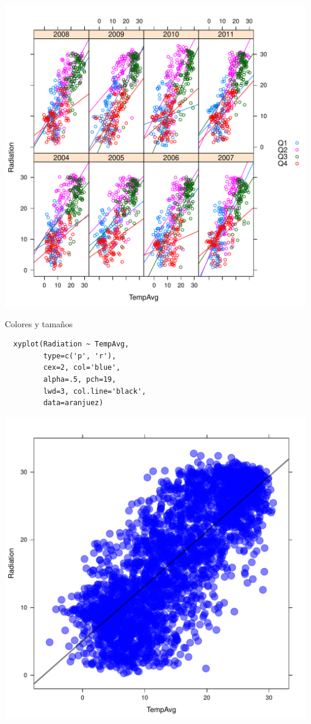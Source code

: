\documentclass[xcolor={usenames,svgnames,dvipsnames}]{beamer}
\begin{document}
\begin{frame}[label=sec-2-1-17]{}
\includegraphics[width=.9\linewidth]{figs/xyplotQuarterYearSmooth.pdf}
\end{frame}

\begin{frame}[fragile,label=sec-2-1-18]{Colores y tamaños}
 \lstset{language=R,label= ,caption= ,numbers=none}
\begin{lstlisting}
  xyplot(Radiation ~ TempAvg,
         type=c('p', 'r'),
         cex=2, col='blue',
         alpha=.5, pch=19,
         lwd=3, col.line='black',
         data=aranjuez)
\end{lstlisting}
\end{frame}

\begin{frame}[label=sec-2-1-19]{}
\includegraphics[width=.9\linewidth]{figs/xyplotColors.pdf}
\end{frame}
\end{document}
